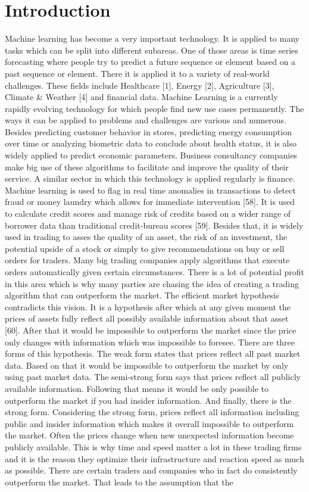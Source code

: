 \documentclass[a4paper,12pt]{report}
\begin{document}
\chapter{Introduction}
Machine learning has become a very important technology. It is applied to many tasks which can be split into different subareas. One of those areas is time series forecasting where people try to predict a future sequence or element based on a past sequence or element. There it is applied it to a variety of real-world challenges. These fields include Healthcare [1], Energy [2], Agriculture [3], Climate \& Weather [4] and financial data. Machine Learning is a currently rapidly evolving technology for which people find new use cases permanently. The ways it can be applied to problems and challenges are various and numerous. Besides predicting customer behavior in stores, predicting energy consumption over time or analyzing biometric data to conclude about health status, it is also widely applied to predict economic parameters. Business consultancy companies make big use of these algorithms to facilitate and improve the quality of their service. A similar sector in which this technology is applied regularly is finance. Machine learning is used to flag in real time anomalies in transactions to detect fraud or money laundry which allows for immediate intervention [58]. It is used to calculate credit scores and manage risk of credits based on a wider range of borrower data than traditional credit-bureau scores [59]. Besides that, it is widely used in trading to asses the quality of an asset, the risk of an investment, the potential upside of a stock or simply to give recommendations on buy or sell orders for traders. Many big trading companies apply algorithms that execute orders automatically given certain circumstances. There is a lot of potential profit in this area which is why many parties are chasing the idea of creating a trading algorithm that can outperform the market. The efficient market hypothesis contradicts this vision. It is a hypothesis after which at any given moment the prices of assets fully reflect all possibly available information about that asset [60]. After that it would be impossible to outperform the market since the price only changes with information which was impossible to foresee. There are three forms of this hypothesis. The weak form states that prices reflect all past market data. Based on that it would be impossible to outperform the market by only using past market data. The semi-strong form says that prices reflect all publicly available information. Following that means it would be only possible to outperform the market if you had insider information. And finally, there is the strong form. Considering the strong form, prices reflect all information including public and insider information which makes it overall impossible to outperform the market. Often the prices change when new unexpected information become publicly available. This is why time and speed matter a lot in these trading firms and it is the reason they optimize their infrastructure and reaction speed as much as possible. There are certain traders and companies who in fact do consistently outperform the market. That leads to the assumption that the 
\end{document}
